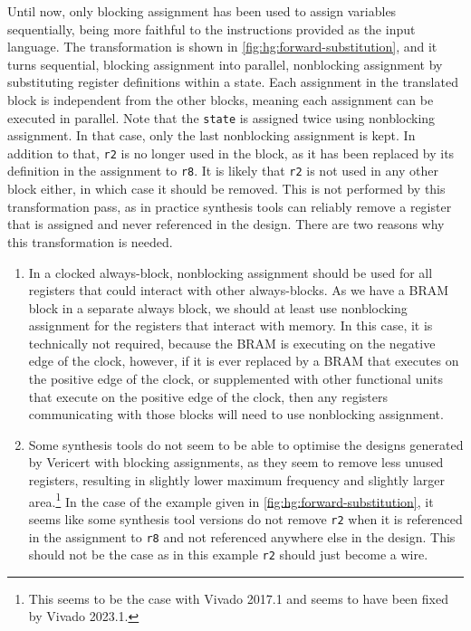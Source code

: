 Until now, only blocking assignment has been used to assign variables
sequentially, being more faithful to the instructions provided as the input
language.  The transformation is shown in \cref{fig:hg:forward-substitution},
and it turns sequential, blocking assignment into parallel, nonblocking
assignment by substituting register definitions within a state.  Each assignment
in the translated block is independent from the other blocks, meaning each
assignment can be executed in parallel.  Note that the \texttt{state} is
assigned twice using nonblocking assignment.  In that case, only the last
nonblocking assignment is kept.  In addition to that, \texttt{r2} is no longer
used in the block, as it has been replaced by its definition in the assignment
to \texttt{r8}.  It is likely that \texttt{r2} is not used in any other block
either, in which case it should be removed.  This is not performed by this
transformation pass, as in practice synthesis tools can reliably remove a
register that is assigned and never referenced in the design.  There are two
reasons why this transformation is needed.

\begin{enumerate}
\item In a clocked always-block, nonblocking assignment should be used for all
  registers that could interact with other always-blocks.  As we have a \gls{BRAM}
  block in a separate always block, we should at least use nonblocking
  assignment for the registers that interact with memory.  In this case, it is
  technically not required, because the \gls{BRAM} is executing on the negative edge of
  the clock, however, if it is ever replaced by a \gls{BRAM} that executes on the
  positive edge of the clock, or supplemented with other functional units that
  execute on the positive edge of the clock, then any registers communicating
  with those blocks will need to use nonblocking assignment.
\item Some synthesis tools do not seem to be able to optimise the designs
  generated by Vericert with blocking assignments, as they seem to remove less
  unused registers, resulting in slightly lower maximum frequency and slightly
  larger area.\footnote{This seems to be the case with Vivado 2017.1 and seems
    to have been fixed by Vivado 2023.1.}  In the case of the example given in
  \cref{fig:hg:forward-substitution}, it seems like some synthesis tool versions
  do not remove \texttt{r2} when it is referenced in the assignment to
  \texttt{r8} and not referenced anywhere else in the design.  This should not
  be the case as in this example \texttt{r2} should just become a wire.
\end{enumerate}

